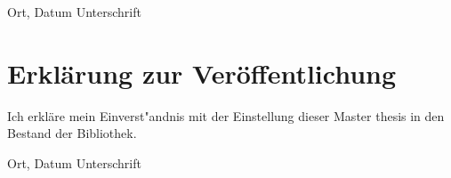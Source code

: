 \documentclass[12pt,final,twoside]{report}
\newcommand{\trtype}{Master thesis} %
\theoremstyle{plain}
\theoremstyle{definition}
\theoremstyle{remark}
\begin{document}

\vspace{4cm}
\noindent Ort, Datum \hfill Unterschrift

\newpage
\thispagestyle{empty}
\hspace{1cm}
\newpage

\vspace{2cm}
\chapter*{Erkl\"arung zur Ver\"offentlichung}
Ich erkl\"are mein Einverst"andnis mit der Einstellung dieser \trtype{} in den Bestand der Bibliothek.

\vspace{4cm}
\noindent Ort, Datum \hfill Unterschrift

\newpage
\thispagestyle{empty}
\hspace{1cm}
\newpage
\end{document}
